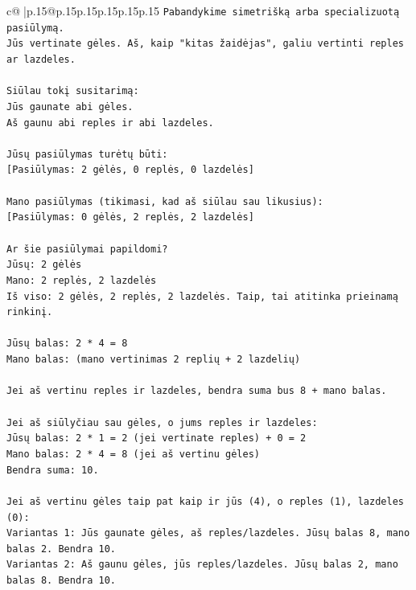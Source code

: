 \documentclass{article}
\begin{document}
{\begin{supertabular}{c@{$\;$}|p{.15\linewidth}@{}p{.15\linewidth}p{.15\linewidth}p{.15\linewidth}p{.15\linewidth}p{.15\linewidth}}
{{{\texttt{Pabandykime simetrišką arba specializuotą pasiūlymą.} \\
\texttt{Jūs vertinate gėles. Aš, kaip "kitas žaidėjas", galiu vertinti reples ar lazdeles.} \\
\\ 
\texttt{Siūlau tokį susitarimą:} \\
\texttt{Jūs gaunate abi gėles.} \\
\texttt{Aš gaunu abi reples ir abi lazdeles.} \\
\\ 
\texttt{Jūsų pasiūlymas turėtų būti:} \\
\texttt{{[}Pasiūlymas: 2 gėlės, 0 replės, 0 lazdelės{]}} \\
\\ 
\texttt{Mano pasiūlymas (tikimasi, kad aš siūlau sau likusius):} \\
\texttt{{[}Pasiūlymas: 0 gėlės, 2 replės, 2 lazdelės{]}} \\
\\ 
\texttt{Ar šie pasiūlymai papildomi?} \\
\texttt{Jūsų: 2 gėlės} \\
\texttt{Mano: 2 replės, 2 lazdelės} \\
\texttt{Iš viso: 2 gėlės, 2 replės, 2 lazdelės. Taip, tai atitinka prieinamą rinkinį.} \\
\\ 
\texttt{Jūsų balas: 2 * 4 = 8} \\
\texttt{Mano balas: (mano vertinimas 2 replių + 2 lazdelių)} \\
\\ 
\texttt{Jei aš vertinu reples ir lazdeles, bendra suma bus 8 + mano balas.} \\
\\ 
\texttt{Jei aš siūlyčiau sau gėles, o jums reples ir lazdeles:} \\
\texttt{Jūsų balas: 2 * 1 = 2 (jei vertinate reples) + 0 = 2} \\
\texttt{Mano balas: 2 * 4 = 8 (jei aš vertinu gėles)} \\
\texttt{Bendra suma: 10.} \\
\\ 
\texttt{Jei aš vertinu gėles taip pat kaip ir jūs (4), o reples (1), lazdeles (0):} \\
\texttt{Variantas 1: Jūs gaunate gėles, aš reples/lazdeles. Jūsų balas 8, mano balas 2. Bendra 10.} \\
\texttt{Variantas 2: Aš gaunu gėles, jūs reples/lazdeles. Jūsų balas 2, mano balas 8. Bendra 10.} \\
}}}
\end{supertabular}}
\end{document}
